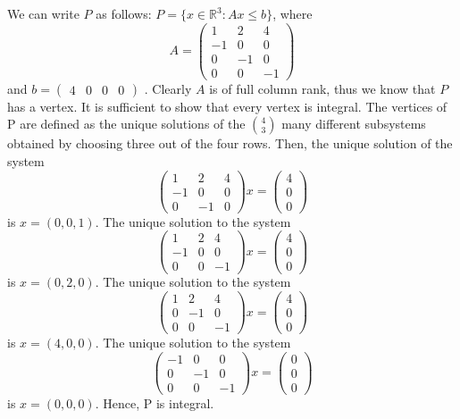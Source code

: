 \documentclass[11pt]{article}
\newcommand{\setR}{\mathbb{R}}
\begin{document}
\begin{enumerate}[1)]
\begin{solution}
We can write $P$ as follows:
$P = \{x ∈ \setR^3 : Ax ≤ b\}$, where $$A = \begin{pmatrix} 1& 2&4 \\-1& 0 & 0 \\ 0 & -1& 0 \\0 & 0 & -1\end{pmatrix}$$ and $b= \begin{pmatrix}4 & 0 & 0 & 0\end{pmatrix}$ . Clearly $A$ is of full column rank, thus we know that $P$ has a vertex. It is sufficient to show
that every vertex is integral. The vertices of P are defined as the unique solutions of the $\binom{4}{3}$ many different subsystems obtained
by choosing three out of the four rows. Then, the unique solution of the system
$$\begin{pmatrix} 1 & 2 & 4 \\ -1 & 0 & 0 \\ 0 & -1 & 0\end{pmatrix}x = \begin{pmatrix} 4 \\ 0 \\ 0 \end{pmatrix}$$
is $x = (0, 0, 1)$. The unique solution to the system 
$$\begin{pmatrix} 1 & 2 & 4 \\ -1 & 0 & 0 \\ 0 & 0 & -1\end{pmatrix}x = \begin{pmatrix} 4 \\ 0 \\ 0 \end{pmatrix}$$
is $x = (0,2,0)$. The unique solution to the system 
$$\begin{pmatrix} 1 & 2 & 4 \\ 0 & -1 & 0 \\ 0 & 0 & -1\end{pmatrix}x = \begin{pmatrix} 4 \\ 0 \\ 0 \end{pmatrix}$$
is $x = (4, 0, 0)$. The unique solution to the system 
$$\begin{pmatrix} -1 & 0 & 0 \\ 0 & -1 & 0 \\ 0 & 0 & -1\end{pmatrix}x = \begin{pmatrix} 0 \\ 0 \\ 0 \end{pmatrix}$$
is $x = (0, 0, 0)$. 
Hence, P is integral.

\end{solution}

\end{enumerate}




  
\end{document}
